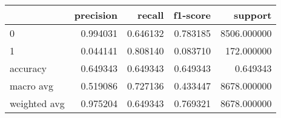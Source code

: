 \begin{tabular}{lrrrr}
\toprule
{} &  precision &    recall &  f1-score &      support \\
\midrule
0            &   0.994031 &  0.646132 &  0.783185 &  8506.000000 \\
1            &   0.044141 &  0.808140 &  0.083710 &   172.000000 \\
accuracy     &   0.649343 &  0.649343 &  0.649343 &     0.649343 \\
macro avg    &   0.519086 &  0.727136 &  0.433447 &  8678.000000 \\
weighted avg &   0.975204 &  0.649343 &  0.769321 &  8678.000000 \\
\bottomrule
\end{tabular}
